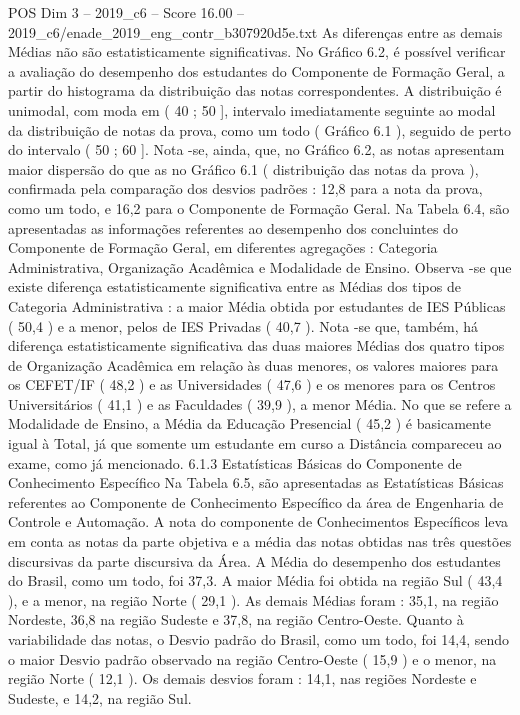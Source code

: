 \begin{textsample}{POS Dim 3 – 2019\_c6 – Score 16.00 – 2019\_c6/enade\_2019\_eng\_contr\_b307920d5e.txt}
As diferenças entre as demais Médias não são estatisticamente significativas.
No Gráfico 6.2, é possível verificar a avaliação do desempenho dos estudantes do Componente de Formação Geral, a partir do histograma da distribuição das notas correspondentes.
A distribuição é unimodal, com moda em ( 40 ; 50 ], intervalo imediatamente seguinte ao modal da distribuição de notas da prova, como um todo ( Gráfico 6.1 ), seguido de perto do intervalo ( 50 ; 60 ].
Nota -se, ainda, que, no Gráfico 6.2, as notas apresentam maior dispersão do que as no Gráfico 6.1 ( distribuição das notas da prova ), confirmada pela comparação dos desvios padrões : 12,8 para a nota da prova, como um todo, e 16,2 para o Componente de Formação Geral.
Na Tabela 6.4, são apresentadas as informações referentes ao desempenho dos concluintes do Componente de Formação Geral, em diferentes agregações : Categoria Administrativa, Organização Acadêmica e Modalidade de Ensino.
Observa -se que existe diferença estatisticamente significativa entre as Médias dos tipos de Categoria Administrativa : a maior Média obtida por estudantes de IES Públicas ( 50,4 ) e a menor, pelos de IES Privadas ( 40,7 ).
Nota -se que, também, há diferença estatisticamente significativa das duas maiores Médias dos quatro tipos de Organização Acadêmica em relação às duas menores, os valores maiores para os CEFET/IF ( 48,2 ) e as Universidades ( 47,6 ) e os menores para os Centros Universitários ( 41,1 ) e as Faculdades ( 39,9 ), a menor Média.
No que se refere a Modalidade de Ensino, a Média da Educação Presencial ( 45,2 ) é basicamente igual à Total, já que somente um estudante em curso a Distância compareceu ao exame, como já mencionado. 6.1.3 Estatísticas Básicas do Componente de Conhecimento Específico Na Tabela 6.5, são apresentadas as Estatísticas Básicas referentes ao Componente de Conhecimento Específico da área de Engenharia de Controle e Automação.
A nota do componente de Conhecimentos Específicos leva em conta as notas da parte objetiva e a média das notas obtidas nas três questões discursivas da parte discursiva da Área.
A Média do desempenho dos estudantes do Brasil, como um todo, foi 37,3.
A maior Média foi obtida na região Sul ( 43,4 ), e a menor, na região Norte ( 29,1 ).
As demais Médias foram : 35,1, na região Nordeste, 36,8 na região Sudeste e 37,8, na região Centro-Oeste.
Quanto à variabilidade das notas, o Desvio padrão do Brasil, como um todo, foi 14,4, sendo o maior Desvio padrão observado na região Centro-Oeste ( 15,9 ) e o menor, na região Norte ( 12,1 ).
Os demais desvios foram : 14,1, nas regiões Nordeste e Sudeste, e 14,2, na região Sul.

\end{textsample}
